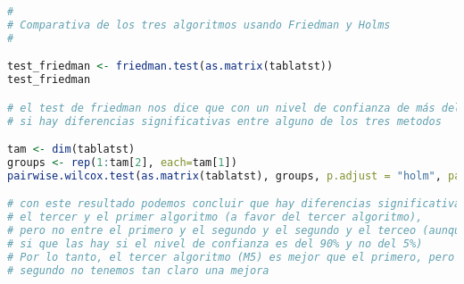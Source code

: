 \begin{lstlisting}[language=R]
#
# Comparativa de los tres algoritmos usando Friedman y Holms
#

test_friedman <- friedman.test(as.matrix(tablatst))
test_friedman

# el test de friedman nos dice que con un nivel de confianza de más del 98%,
# si hay diferencias significativas entre alguno de los tres metodos

tam <- dim(tablatst)
groups <- rep(1:tam[2], each=tam[1])
pairwise.wilcox.test(as.matrix(tablatst), groups, p.adjust = "holm", paired = TRUE)

# con este resultado podemos concluir que hay diferencias significativas entre
# el tercer y el primer algoritmo (a favor del tercer algoritmo),
# pero no entre el primero y el segundo y el segundo y el terceo (aunque con este último
# si que las hay si el nivel de confianza es del 90% y no del 5%)
# Por lo tanto, el tercer algoritmo (M5) es mejor que el primero, pero con el
# segundo no tenemos tan claro una mejora

\end{lstlisting}


\newpage
